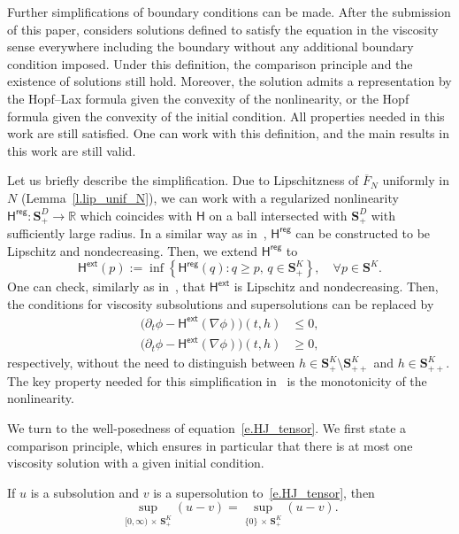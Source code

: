 \documentclass[AHL,Unicode,longabstracts,published]{cedram}
\newcommand{\R}{\mathbb{R}}
\renewcommand{\S}{\mathbf{S}}
\renewcommand{\H}{\mathsf{H}}
\newcommand{\reg}{\mathsf{reg}}
\newcommand{\extl}{\mathsf{ext}}
\renewcommand{\leq}{\leqslant}
\renewcommand{\geq}{\geqslant}
\renewcommand{\bar}{\overline}
\let\oldforall\forall
\renewcommand*{\forall}{\mathrel{\oldforall}}
\begin{document}
\begin{rema}\label{r.boundary}
Further simplifications of boundary conditions can be made. After the submission of this paper, \cite{chen2022hamilton} considers solutions defined to satisfy the equation in the viscosity sense everywhere including the boundary without any additional boundary condition imposed. Under this definition, the comparison principle and the existence of solutions still hold. Moreover, the solution admits a representation by the Hopf--Lax formula given the convexity of the nonlinearity, or the Hopf formula given the convexity of the initial condition. All properties needed in this work are still satisfied. One can work with this definition, and the main results in this work are still valid.

Let us briefly describe the simplification. Due to Lipschitzness of $\bar F_N$ uniformly in $N$ (Lemma~\ref{l.lip_unif_N}), we can work with a regularized nonlinearity $\H^{\reg}:\S^D_+\to\R$ which coincides with $\H$ on a ball intersected with $\S^D_+$ with sufficiently large radius. In a similar way as in~\cite[Lemma~4.2]{chen2022hamilton}, $\H^{\reg}$ can be constructed to be Lipschitz and nondecreasing. Then, we extend $\H^{\reg}$ to
\[
\H^{\extl}(p):=\inf\left\{\H^{\reg}(q):q\geq p,\, q\in\S^K_+\right\},\quad\forall p\in\S^K.
\]
One can check, similarly as in~\cite[Lemma~4.4]{chen2022hamilton}, that $\H^{\extl}$ is Lipschitz and nondecreasing. Then, the conditions for viscosity subsolutions and supersolutions can be replaced by
\begin{align*}
\big(\partial_t \phi - \H^{\extl}(\nabla\phi)\big)(t,h) &\leq 0,
\\
\big(\partial_t \phi - \H^{\extl}(\nabla\phi)\big)(t,h) &\geq 0,
\end{align*}
respectively, without the need to distinguish between $h\in \S^K_+\setminus\S^K_{++}$ and $h\in \S^K_{++}$. The key property needed for this simplification in~\cite{chen2022hamilton} is the monotonicity of the nonlinearity.
\end{rema}



We turn to the well-posedness of equation~\eqref{e.HJ_tensor}. We first state a comparison principle, which ensures in particular that there is at most one viscosity solution with a given initial condition.
\begin{prop}\label{p.comp}
If $u$ is a {subsolution} and $v$ is a {supersolution} to~\eqref{e.HJ_tensor}, then
\[
\sup_{[0,\infty)\,\times\,\S^K_+}(u-v)=\sup_{\{0\}\,\times\,\S^K_+}(u-v).
\]
\end{prop}
\end{document}
